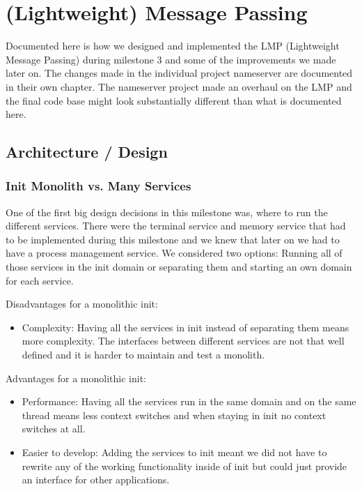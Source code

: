 \chapter{(Lightweight) Message Passing}

Documented here is how we designed and implemented the LMP (Lightweight Message Passing) during milestone 3 and some of the improvements we made later on. The changes made in the individual project nameserver are documented in their own chapter. The nameserver project made an overhaul on the LMP and the final code base might look substantially different than what is documented here.

\section{Architecture / Design}

\subsection{Init Monolith vs. Many Services}

One of the first big design decisions in this milestone was, where to run the different services. There were the terminal service and memory service that had to be implemented during this milestone and we knew that later on we had to have a process management service. We considered two options: Running all of those services in the init domain or separating them and starting an own domain for each service.

Disadvantages for a monolithic init:
\begin{itemize}
    \item Complexity: Having all the services in init instead of separating them means more complexity. The interfaces between different services are not that well defined and it is harder to maintain and test a monolith.
\end{itemize}

Advantages for a monolithic init:
\begin{itemize}
    \item Performance: Having all the services run in the same domain and on the same thread means less context switches and when staying in init no context switches at all.
    \item Easier to develop: Adding the services to init meant we did not have to rewrite any of the working functionality inside of init but could just provide an interface for other applications.
\end{itemize}

